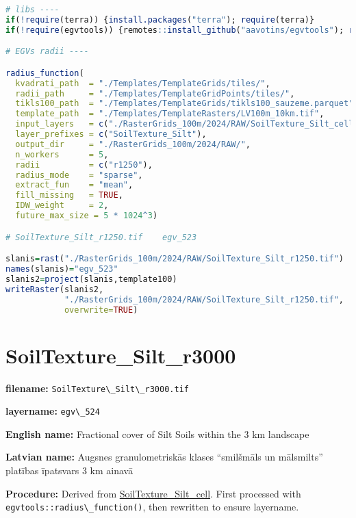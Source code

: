 \documentclass[
]{book}
\newcommand{\passthrough}[1]{#1}
\begin{document}
\begin{lstlisting}[language=R]
# libs ----
if(!require(terra)) {install.packages("terra"); require(terra)}
if(!require(egvtools)) {remotes::install_github("aavotins/egvtools"); require(egvtools)}

# EGVs radii ----

radius_function(
  kvadrati_path  = "./Templates/TemplateGrids/tiles/",
  radii_path     = "./Templates/TemplateGridPoints/tiles/",
  tikls100_path  = "./Templates/TemplateGrids/tikls100_sauzeme.parquet",
  template_path  = "./Templates/TemplateRasters/LV100m_10km.tif",
  input_layers   = c("./RasterGrids_100m/2024/RAW/SoilTexture_Silt_cell.tif"),
  layer_prefixes = c("SoilTexture_Silt"),
  output_dir     = "./RasterGrids_100m/2024/RAW/",
  n_workers      = 5,
  radii          = c("r1250"),
  radius_mode    = "sparse",
  extract_fun    = "mean",
  fill_missing   = TRUE,
  IDW_weight     = 2,
  future_max_size = 5 * 1024^3)

# SoilTexture_Silt_r1250.tif    egv_523

slanis=rast("./RasterGrids_100m/2024/RAW/SoilTexture_Silt_r1250.tif")
names(slanis)="egv_523"
slanis2=project(slanis,template100)
writeRaster(slanis2,
            "./RasterGrids_100m/2024/RAW/SoilTexture_Silt_r1250.tif",
            overwrite=TRUE)
\end{lstlisting}

\section{SoilTexture\_Silt\_r3000}\label{ch06.524}

\textbf{filename:} \passthrough{\lstinline!SoilTexture\_Silt\_r3000.tif!}

\textbf{layername:} \passthrough{\lstinline!egv\_524!}

\textbf{English name:} Fractional cover of Silt Soils within the 3 km landscape

\textbf{Latvian name:} Augsnes granulometriskās klases ``smilšmāls un mālsmilts'' platības īpatsvars 3 km ainavā

\textbf{Procedure:} Derived from \hyperref[ch06.521]{SoilTexture\_Silt\_cell}. First processed
with \passthrough{\lstinline!egvtools::radius\_function()!}, then rewritten to ensure layername.
\end{document}

